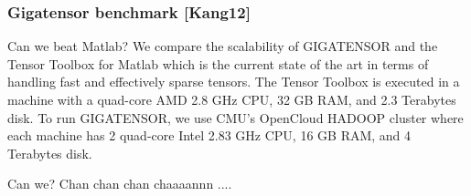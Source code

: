 \begin{frame}[plain]
	\frametitle{Gigatensor benchmark [Kang12]}
	\begin{block}{Can we beat Matlab?}
    We compare the scalability of GIGATENSOR and the Tensor
    Toolbox for Matlab which is the current state of the art in terms 
    of handling fast and effectively sparse tensors. The Tensor Toolbox
    is executed in a machine with a quad-core AMD 2.8 GHz CPU,
    32 GB RAM, and 2.3 Terabytes disk. To run GIGATENSOR, we
    use CMU’s OpenCloud HADOOP cluster where each machine has
    2 quad-core Intel 2.83 GHz CPU, 16 GB RAM, and 4 Terabytes
    disk.
	\end{block}
	\begin{block}{Can we?}
    Chan chan chan chaaaannn ....
	\end{block}
\end{frame}
